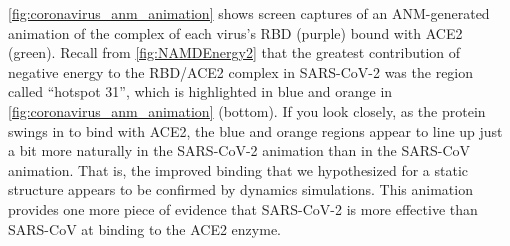 \autoref{fig:coronavirus_anm_animation} shows screen captures of an ANM-generated animation of the complex of each virus's RBD (purple) bound with ACE2 (green). Recall from \autoref{fig:NAMDEnergy2} that the greatest contribution of negative energy to the RBD/ACE2 complex in SARS-CoV-2 was the region called ``hotspot 31'', which is highlighted in blue and orange in \autoref{fig:coronavirus_anm_animation} (bottom). If you look closely, as the protein swings in to bind with ACE2, the blue and orange regions appear to line up just a bit more naturally in the SARS-CoV-2 animation than in the SARS-CoV animation. That is, the improved binding that we hypothesized for a static structure appears to be confirmed by dynamics simulations. This animation provides one more piece of evidence that SARS-CoV-2 is more effective than SARS-CoV at binding to the ACE2 enzyme.\\

